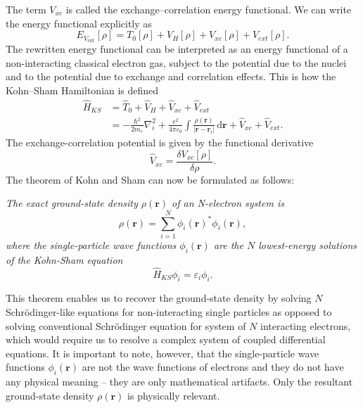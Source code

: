 The term $V_{xc}$ is called the exchange--correlation energy functional. We
can write the energy functional explicitly as
\begin{equation}
  E_{V_\mathrm{ext}}[\rho] = T_0[\rho] + V_H[\rho] + V_{xc}[\rho]
  + V_{ext}[\rho].
\end{equation}
The rewritten energy functional can be interpreted as an energy functional of
a non-interacting classical electron gas, subject to the potential due to the
nuclei and to the potential due to exchange and correlation effects. This is
how the Kohn--Sham Hamiltonian is defined
\begin{equation}
\begin{alignedat}{2}
  \hat H_{KS} &= \hat T_0 + \hat V_H + \hat V_{xc} + \hat V_{ext} \\
  &= -\frac{\hbar^2}{2 m_e} \nabla_i^2
  + \frac{e^2}{4 \pi \varepsilon_0} \int
  \frac{\rho(\mathbf{r})}{|\mathbf{r} - \mathbf{r}_i|} \, \mathrm{d}\mathbf{r}
  + \hat V_{xc} + \hat V_{ext}.
\end{alignedat}
\end{equation}
The exchange-correlation potential is given by the functional derivative
\begin{equation}
  \hat V_{xc} = \frac{\delta V_{xc}[\rho]}{\delta \rho}.
\end{equation}
The theorem of Kohn and Sham can now be formulated as follows:
\begin{displayquote}
  \textit{
    The exact ground-state density $\rho(\mathbf{r})$ of an N-electron system
    is
  }
  \begin{equation}
    \rho(\mathbf{r}) = \sum_{i=1}^N \phi_i(\mathbf{r})^* \phi_i(\mathbf{r}),
  \end{equation}
  \textit{
    where the single-particle wave functions $\phi_i(\mathbf{r})$ are the $N$
    lowest-energy solutions of the Kohn-Sham equation
  }
  \begin{equation}
    \hat H_{KS} \phi_i = \varepsilon_i \phi_i.
  \end{equation}
\end{displayquote}
This theorem enables us to recover the ground-state density by solving $N$
Schrödinger-like equations for non-interacting single particles as opposed to
solving conventional Schrödinger equation for system of $N$ interacting
electrons, which would require us to resolve a complex system of coupled
differential equations. It is important to note, however, that the
single-particle wave functions $\phi_i(\mathbf{r})$ are not the wave functions
of electrons and they do not have any physical meaning -- they are only
mathematical artifacts. Only the resultant ground-state density
$\rho(\mathbf{r})$ is physically relevant.

